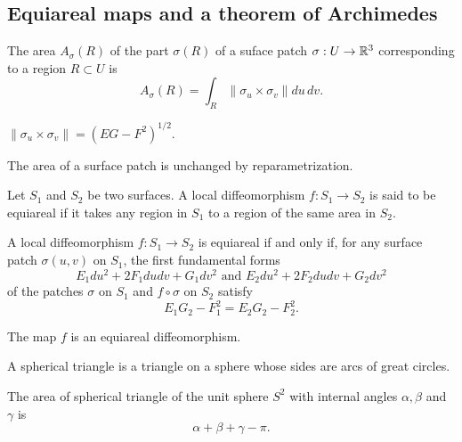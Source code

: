 \subsection{Equiareal maps and a theorem of Archimedes}

\begin{defn}
  The area $A_{\sigma}(R)$ of the part $\sigma(R)$ of a suface patch
  $\sigma: U \to \mathbb{R}^3$ corresponding to a region $R \subset U$ is
  \[
    A_{\sigma}(R) = \int_R \|\sigma_u \times \sigma_v\| du\,dv.
  \]
\end{defn}

\begin{proposition}
  $\|\sigma_u \times \sigma_v\| = (EG - F^2)^{1 / 2}$.
\end{proposition}

\begin{proposition}
  The area of a surface patch is unchanged by reparametrization.
\end{proposition}

\begin{defn}
  Let $S_1$ and $S_2$ be two surfaces.
  A local diffeomorphism $f: S_1 \to S_2$ is said to be equiareal if
  it takes any region in $S_1$ to a region of the same area in $S_2$.
\end{defn}

\begin{theorem}
  A local diffeomorphism $f: S_1 \to S_2$ is equiareal if and only if,
  for any surface patch $\sigma(u, v)$ on $S_1$, the first fundamental forms
  \[
    E_1 du^2 + 2 F_1 du dv + G_1 dv^2  
    \text{ and }
    E_2 du^2 + 2 F_2 du dv + G_2 dv^2
  \]
  of the patches $\sigma$ on $S_1$ and $f \circ \sigma$ on $S_2$ satisfy
  \[
    E_1 G_2 - F_1^2 = E_2 G_2 - F_2^2.  
  \]
\end{theorem}

\begin{theorem}
  The map $f$ is an equiareal diffeomorphism.
\end{theorem}

A spherical triangle is a triangle on a sphere whose sides are
arcs of great circles.

\begin{theorem}
  The area of spherical triangle of the unit sphere $S^2$ with internal
  angles $\alpha, \beta$ and $\gamma$ is
  \[
    \alpha + \beta + \gamma - \pi.  
  \]
\end{theorem}